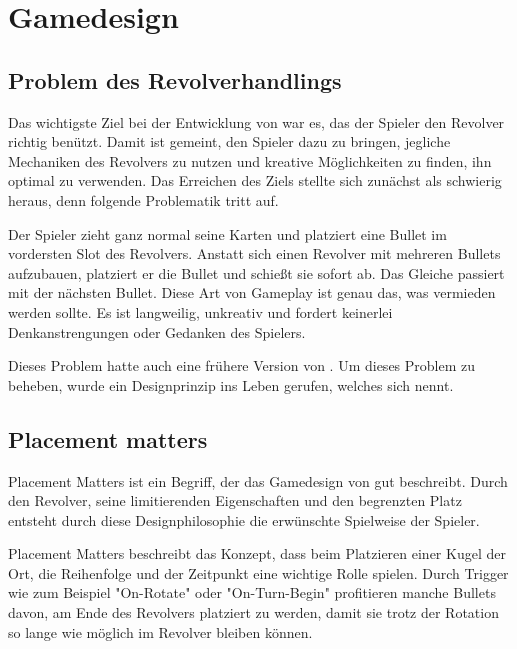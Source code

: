 
\section{Gamedesign}\label{sec:Gamedesign}

\renewcommand{\kapitelautor}{Autor: Philip Jankovic}


\subsection{Problem des Revolverhandlings}\label{subsec:gamedesignBehindBullets}

Das wichtigste Ziel bei der Entwicklung von \FF war es, das der Spieler den Revolver richtig benützt. Damit ist gemeint,
den Spieler dazu zu bringen, jegliche Mechaniken des Revolvers zu nutzen und kreative Möglichkeiten zu finden, ihn optimal zu verwenden.
Das Erreichen des Ziels stellte sich zunächst als schwierig heraus, denn folgende Problematik tritt auf.


Der Spieler zieht ganz normal seine Karten und platziert eine Bullet im vordersten Slot des Revolvers.
Anstatt sich einen Revolver mit mehreren Bullets aufzubauen, platziert er die Bullet und schießt sie sofort ab.
Das Gleiche passiert mit der nächsten Bullet. Diese Art von Gameplay ist genau das, was vermieden werden sollte.
Es ist langweilig, unkreativ und fordert keinerlei Denkanstrengungen oder Gedanken des Spielers.


Dieses Problem hatte auch eine frühere Version von \FF. Um dieses Problem zu beheben, wurde ein Designprinzip
ins Leben gerufen, welches sich  nennt.


\subsection{Placement matters}\label{subsec:placementMatters}

Placement Matters ist ein Begriff, der das Gamedesign von \FF gut beschreibt. Durch den Revolver, seine limitierenden
Eigenschaften und den begrenzten Platz entsteht durch diese Designphilosophie die erwünschte Spielweise der Spieler.

Placement Matters beschreibt das Konzept, dass beim Platzieren einer Kugel der Ort, die Reihenfolge und der Zeitpunkt
eine wichtige Rolle spielen. Durch Trigger wie zum Beispiel "On-Rotate" oder "On-Turn-Begin" profitieren manche Bullets davon,
am Ende des Revolvers platziert zu werden, damit sie trotz der Rotation so lange wie möglich im Revolver bleiben können.


